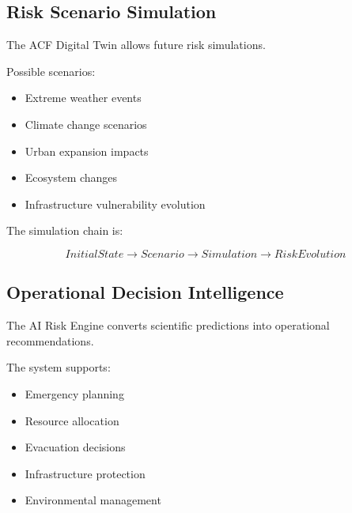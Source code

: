 
\subsection{Risk Scenario Simulation}

The ACF Digital Twin allows future risk simulations.

Possible scenarios:

\begin{itemize}

\item Extreme weather events

\item Climate change scenarios

\item Urban expansion impacts

\item Ecosystem changes

\item Infrastructure vulnerability evolution

\end{itemize}


The simulation chain is:

\[
InitialState
\rightarrow
Scenario
\rightarrow
Simulation
\rightarrow
RiskEvolution
\]



\subsection{Operational Decision Intelligence}

The AI Risk Engine converts scientific predictions into operational
recommendations.

The system supports:

\begin{itemize}

\item Emergency planning

\item Resource allocation

\item Evacuation decisions

\item Infrastructure protection

\item Environmental management

\end{itemize}


